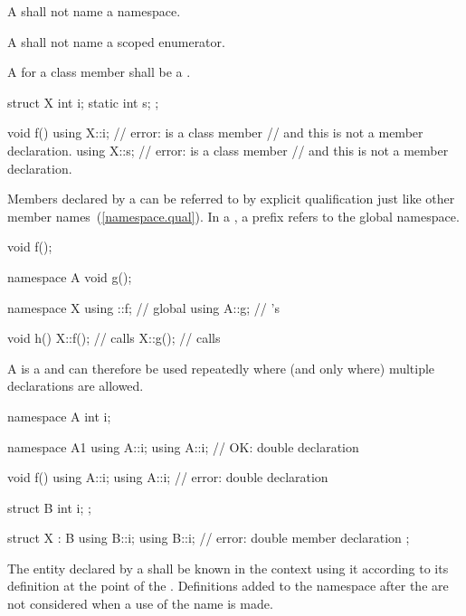 \pnum
A  shall not name a namespace.

\pnum
A  shall not name a scoped enumerator.

\pnum
A  for a class member shall be a
.
\enterexample

\begin{codeblock}
struct X {
  int i;
  static int s;
};

void f() {
  using X::i;       // error:  is a class member
                    // and this is not a member declaration.
  using X::s;       // error:  is a class member
                    // and this is not a member declaration.
}
\end{codeblock}
\exitexample

\pnum
Members declared by a  can be referred to by
explicit qualification just like other member
names~(\ref{namespace.qual}). In a , a
prefix \tcode{::} refers to the global namespace.
\enterexample

\begin{codeblock}
void f();

namespace A {
  void g();
}

namespace X {
  using ::f;        // global 
  using A::g;       // 's 
}

void h()
{
  X::f();           // calls 
  X::g();           // calls 
}
\end{codeblock}
\exitexample

\pnum
A  is a  and can
therefore be used repeatedly where (and only where) multiple
declarations are allowed.
\enterexample

\begin{codeblock}
namespace A {
  int i;
}

namespace A1 {
  using A::i;
  using A::i;       // OK: double declaration
}

void f() {
  using A::i;
  using A::i;       // error: double declaration
}

struct B {
  int i;
};

struct X : B {
  using B::i;
  using B::i;       // error: double member declaration
};
\end{codeblock}
\exitexample

\pnum
The entity declared by a  shall be known in
the context using it according to its definition at the point of the
. Definitions added to the namespace after
the  are not considered when a use of the
name is made.
\enterexample

